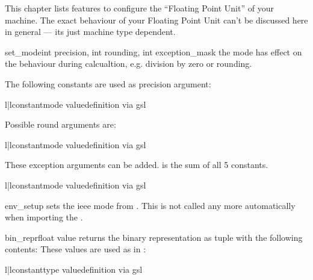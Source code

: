 
This chapter lists features to configure the ``Floating Point Unit'' of your machine.
The exact behaviour of your Floating Point Unit can't be discussed here in general --- its just machine type dependent.

\begin{funcdesc} {set_mode}{int precision, int rounding, int exception\_mask}
the mode has effect on the behaviour during calcualtion, e.g. division by zero or rounding.

The following constants are used as precision argument:
\begin{tableii}{l|l}{constant}{mode value}{definition via gsl}
\end{tableii}
Possible round arguments are:
\begin{tableii}{l|l}{constant}{mode value}{definition via gsl}
\end{tableii}
These exception arguments can be added.
 is the sum of all 5  constants.
\begin{tableii}{l|l}{constant}{mode value}{definition via gsl}
\end{tableii}
\end{funcdesc}

\begin{funcdesc} {env\_setup}{}
sets the ieee mode from . This is not called any more
automatically  when importing the  .
\end{funcdesc}

\begin{funcdesc} {bin\_repr}{float value}
returns the binary representation as tuple with the following contents:
These values are used as  in :
\begin{tableii}{l|l}{constant}{type value}{definition via gsl}
\end{tableii}
\end{funcdesc}

